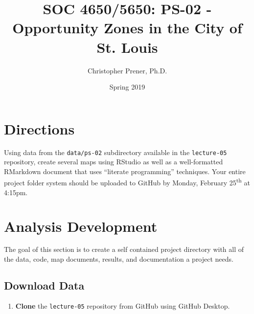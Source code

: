 \documentclass{tufte-handout}
\title{SOC 4650/5650: PS-02 - Opportunity Zones in the City of St. Louis}
\author{Christopher Prener, Ph.D.}
\date{Spring 2019}
\begin{document}
\maketitle %

\vspace{5mm}
\section{Directions}
Using data from the \texttt{data/ps-02} subdirectory available in the \texttt{lecture-05} repository, create several maps using RStudio as well as a well-formatted RMarkdown document that uses ``literate programming'' techniques. Your entire project folder system should be uploaded to GitHub by Monday, February 25\textsuperscript{th} at 4:15pm.

\vspace{5mm}
\section{Analysis Development}
The goal of this section is to create a self contained project directory with all of the data, code, map documents, results, and documentation a project needs.

\vspace{3mm}
\subsection{Download Data}
\begin{enumerate}[label=\alph*.]
\item \textbf{Clone} the \texttt{lecture-05} repository from GitHub using GitHub Desktop.
\end{enumerate}

\vspace{3mm}
\end{document}
